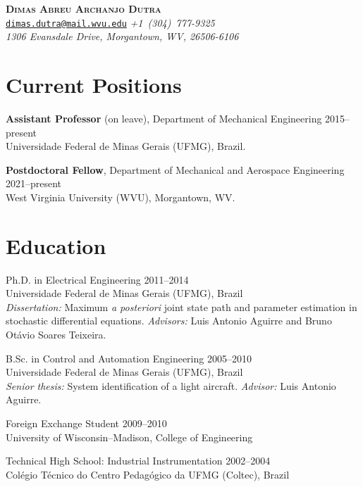 \documentclass[a4paper, 11pt, oneside]{memoir}
\begin{document}
\thispagestyle{plain}

\begin{center}
  {
    \LARGE \bfseries \scshape 
    Dimas Abreu Archanjo Dutra
  }
  \\[1ex]
  \small
  \texttt{\href{mailto:dimas.dutra@mail.wvu.edu}{dimas.dutra@mail.wvu.edu}}
  \itshape\qquad
  +1~(304)~777-9325
  \\
  1306 Evansdale Drive, Morgantown, WV, 26506-6106
\end{center}

\section{Current Positions}

\begin{description}
\item \textbf{Assistant Professor} (on leave), 
  Department of Mechanical Engineering
  \hfill 2015--present
  \\
  Universidade Federal de Minas Gerais (UFMG), Brazil.

\item \textbf{Postdoctoral Fellow}, 
  Department of Mechanical and Aerospace Engineering
  \hfill 2021--present
  \\
  West Virginia University (WVU), Morgantown, WV.
\end{description}

\section{Education}
\begin{description}
\item Ph.D. in Electrical Engineering \hfill 2011--2014
  \\
  Universidade Federal de Minas Gerais (UFMG), Brazil
  \\
  \emph{Dissertation:} Maximum \emph{a posteriori} joint state path and
  parameter estimation in stochastic differential equations.
  \emph{Advisors:} Luis Antonio Aguirre and Bruno Otávio Soares Teixeira.

\item B.Sc. in Control and Automation Engineering
  \hfill 2005--2010
  \\
  Universidade Federal de Minas Gerais (UFMG), Brazil
  \\
  \textit{Senior thesis:} System identification of a light aircraft.
  \emph{Advisor:} Luis Antonio Aguirre.
\item Foreign Exchange Student \hfill 2009--2010
  \\
  University of Wisconsin--Madison, College of Engineering
\item Technical High School: Industrial Instrumentation \hfill 2002--2004
  \\
  Colégio Técnico do Centro Pedagógico da UFMG (Coltec), Brazil
\end{description}
\end{document}
